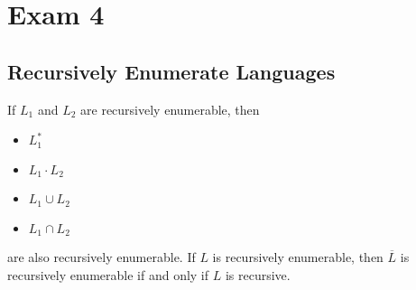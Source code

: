 \section{Exam 4}\label{sec:exam-4-cheatsheet}

\subsection{Recursively Enumerate Languages}

If \(L_1\) and \(L_2\) are recursively enumerable, then

\begin{itemize}
    \item \(L_1^*\)
    \item \(L_1\cdot L_2\)
    \item \(L_1\cup L_2\)
    \item \(L_1\cap L_2\)
\end{itemize}

are also recursively enumerable. If \(L\) is recursively enumerable, then \(\overline{L}\) is recursively enumerable if and only if \(L\) is recursive.

